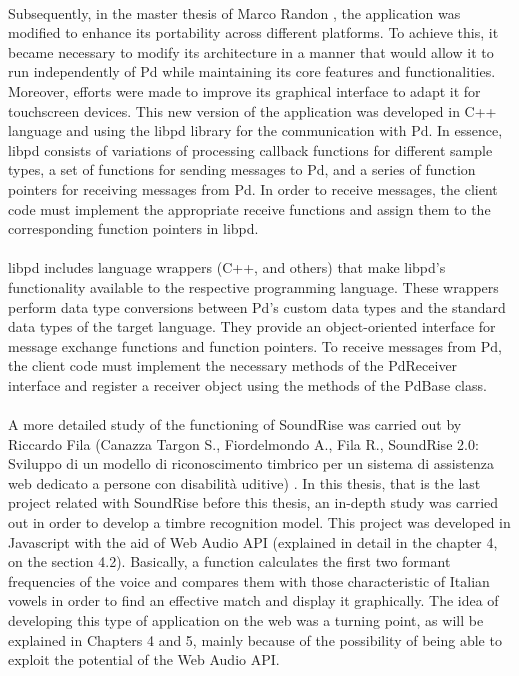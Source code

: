 \paragraph{}
Subsequently, in the master thesis of Marco Randon \cite{randon2012}, the application was modified to enhance its portability across different platforms. To achieve this, it became necessary to modify its architecture in a manner that would allow it to run independently of Pd while maintaining its core features and functionalities. Moreover, efforts were made to improve its graphical interface to adapt it for touchscreen devices. This new version of the application was developed in C++ language and using the libpd library for the communication with Pd. In essence, libpd consists of variations of processing callback functions for different sample types, a set of functions for sending messages to Pd, and a series of function pointers for receiving messages from Pd. In order to receive messages, the client code must implement the appropriate receive functions and assign them to the corresponding function pointers in libpd.

\paragraph{}
libpd includes language wrappers (C++, and others) that make libpd's functionality available to the respective programming language. These wrappers perform data type conversions between Pd's custom data types and the standard data types of the target language. They provide an object-oriented interface for message exchange functions and function pointers. To receive messages from Pd, the client code must implement the necessary methods of the PdReceiver interface and register a receiver object using the methods of the PdBase class.

\paragraph{}
A more detailed study of the functioning of SoundRise was carried out by Riccardo Fila (Canazza Targon S., Fiordelmondo A., Fila R., SoundRise 2.0: Sviluppo di un modello di riconoscimento timbrico per un sistema di assistenza web dedicato a persone con disabilità uditive) \cite{fila2020}. In this thesis, that is the last project related with SoundRise before this thesis, an in-depth study was carried out in order to develop a timbre recognition model. This project was developed in Javascript with the aid of Web Audio API (explained in detail in the chapter 4, on the section 4.2). Basically, a function calculates the first two formant frequencies of the voice and compares them with those characteristic of Italian vowels in order to find an effective match and display it graphically. The idea of developing this type of application on the web was a turning point, as will be explained in Chapters 4 and 5, mainly because of the possibility of being able to exploit the potential of the Web Audio API.

